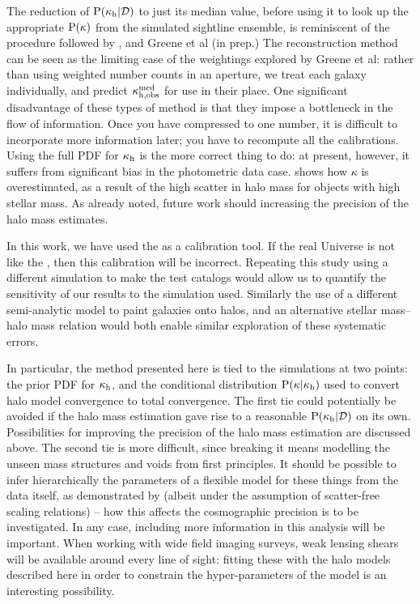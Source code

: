 \documentclass[useAMS,usenatbib]{mn2e}
\begin{document}
The reduction of ${\rm P}(\kappa_{\rm h}|{\mathcal{D}})$ to just its median value, before using
it to look up the appropriate ${\rm P}(\kappa)$ from the simulated sightline
ensemble, is reminiscent of the procedure followed by \citet{SuyuEtal2010},
and Greene et al (in prep.) The reconstruction method can be seen as the
limiting case of the weightings explored by Greene et al: rather than using
weighted number counts in an aperture, we treat each galaxy individually, and
predict  $\kappa_{\rm h,obs}^{\rm med}$ for use in their place. One
significant disadvantage of these types of method is that they impose a
bottleneck in the flow of information. Once you have compressed to one number,
it is difficult to incorporate more information later; you have to recompute
all the calibrations. Using the full PDF for $\kappa_{\rm h}$ is the more correct
thing to do: at present, however, it suffers from significant bias in the
photometric data case.  shows how $\kappa$ is
overestimated, as a result of the high scatter in halo mass for objects with 
high stellar mass. As already noted, 
future work should increasing the precision of the halo
mass estimates. 

In this work, we have used 
the \MS as a calibration tool. If the real Universe is not
like the \MS, then this calibration will be incorrect. Repeating this 
study using
a different simulation to make the test catalogs would allow us to quantify
the sensitivity of our results to the simulation used. Similarly the use of a
different semi-analytic model to paint galaxies onto halos, and an alternative
stellar mass--halo mass relation would both enable similar exploration of
these systematic errors.

In particular, the method presented here is tied to the simulations at two
points: the prior PDF for $\kappa_{\rm h}$, and the conditional distribution
${\rm P}(\kappa|\kappa_{\rm h})$ used to convert halo model convergence to total
convergence. The first tie could potentially be avoided if the halo mass
estimation gave rise to a reasonable ${\rm P}(\kappa_{\rm h}|{\mathcal{D}})$ on its own.
Possibilities for improving the precision of the halo mass estimation are
discussed above. The second tie is more difficult, since breaking it means
modelling the unseen mass structures and voids from first principles. It
should be possible to infer hierarchically  the parameters of a flexible model
for these things from the data itself, as demonstrated by
\citet{KarpenkaEtal2012} (albeit under the assumption of scatter-free scaling
relations) -- how this affects the cosmographic precision is to be
investigated.  In any case, 
including more information in this analysis will be important.
When working with wide field imaging surveys,  weak lensing shears will be
available around every line of sight:  fitting these with the halo models
described here in order to constrain the hyper-parameters of the model is an
interesting possibility.
\end{document}
